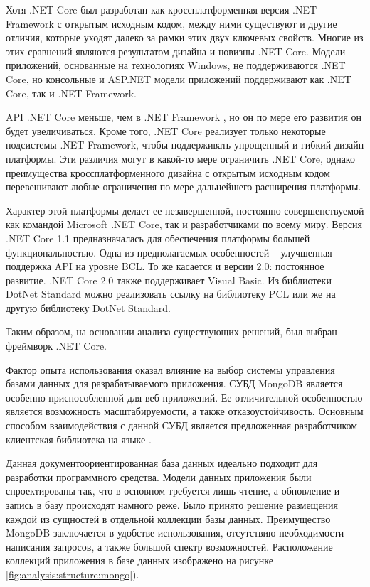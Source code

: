Хотя .NET Core был разработан как кроссплатформенная версия .NET Framework с открытым исходным кодом, между ними существуют и другие отличия, которые уходят далеко за рамки этих двух ключевых свойств. Многие из этих сравнений являются результатом дизайна и новизны .NET Core. Модели приложений, основанные на технологиях Windows, не поддерживаются .NET Core, но консольные и ASP.NET модели приложений поддерживают как .NET Core, так и .NET Framework.

API .NET Core меньше, чем в .NET Framework \cite{richter}, но он по мере его развития он будет увеличиваться. Кроме того, .NET Core реализует только некоторые подсистемы .NET Framework, чтобы поддерживать упрощенный и гибкий дизайн платформы. Эти различия могут в какой-то мере ограничить .NET Core, однако преимущества кроссплатформенного дизайна с открытым исходным кодом перевешивают любые ограничения по мере дальнейшего расширения платформы.

Характер этой платформы делает ее незавершенной, постоянно совершенствуемой как командой Microsoft .NET Core, так и разработчиками по всему миру. Версия .NET Core 1.1 предназначалась для обеспечения платформы большей функциональностью. Одна из предполагаемых особенностей – улучшенная поддержка API на уровне BCL. То же касается и версии 2.0: постоянное развитие. .NET Core 2.0 также поддерживает Visual Basic. Из библиотеки DotNet Standard можно реализовать ссылку на библиотеку PCL или же на другую библиотеку DotNet Standard.

Таким образом, на основании анализа существующих решений, был выбран фреймворк .NET Core.

Фактор опыта использования оказал влияние на выбор системы управления базами данных для разрабатываемого приложения. СУБД MongoDB является особенно приспособленной для веб-приложений. Ее отличительной особенностью является возможность масштабируемости, а также отказоустойчивость. Основным способом взаимодействия с данной СУБД является предложенная разработчиком клиентская библиотека на языке \csharp.

Данная документоориентированная база данных идеально подходит для разработки программного средства. Модели данных приложения были спроектированы так, что в основном требуется лишь чтение, а обновление и запись в базу происходят намного реже. Было принято решение размещения каждой из сущностей в отдельной коллекции базы данных. Преимущество MongoDB заключается в удобстве использования, отсутствию необходимости написания запросов, а также большой спектр возможностей. Расположение коллекций приложения в базе данных изображено на рисунке \ref{fig:analysis:structure:mongo}).

